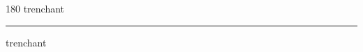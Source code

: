 
\begin{frame}
\begin{center}
\begin{turn}{180}
{\fontsize{2.5cm}{1em}\selectfont trenchant}
\end{turn}
\vspace{1em}\par  
\hrule
\vspace{1em}\par  
{\fontsize{2.5cm}{1em}\selectfont trenchant}
\end{center}
\end{frame}
